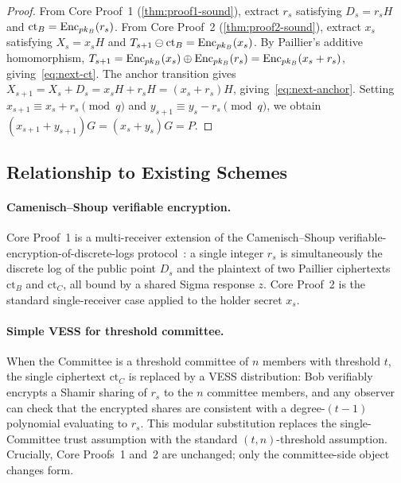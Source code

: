 \begin{proof}
From Core Proof~1 (\autoref{thm:proof1-sound}), extract $r_s$ satisfying $D_s = r_s H$ and $\mathrm{ct}_B = \mathrm{Enc}_{pk_B}(r_s)$. From Core Proof~2 (\autoref{thm:proof2-sound}), extract $x_s$ satisfying $X_s = x_s H$ and $T_{s+1} \ominus \mathrm{ct}_B = \mathrm{Enc}_{pk_B}(x_s)$. By Paillier's additive homomorphism, $T_{s+1} = \mathrm{Enc}_{pk_B}(x_s) \oplus \mathrm{Enc}_{pk_B}(r_s) = \mathrm{Enc}_{pk_B}(x_s + r_s)$, giving~\eqref{eq:next-ct}. The anchor transition gives $X_{s+1} = X_s + D_s = x_s H + r_s H = (x_s + r_s) H$, giving~\eqref{eq:next-anchor}. Setting $x_{s+1} \equiv x_s + r_s \pmod{q}$ and $y_{s+1} \equiv y_s - r_s \pmod{q}$, we obtain $(x_{s+1} + y_{s+1})G = (x_s + y_s)G = P$.
\end{proof}

\subsection{Relationship to Existing Schemes}\label{sec:relationship}

\paragraph{Camenisch--Shoup verifiable encryption.} Core Proof~1 is a multi-receiver extension of the Camenisch--Shoup verifiable-encryption-of-discrete-logs protocol~\cite{camenisch2003verifiable}: a single integer $r_s$ is simultaneously the discrete log of the public point $D_s$ and the plaintext of two Paillier ciphertexts $\mathrm{ct}_B$ and $\mathrm{ct}_C$, all bound by a shared Sigma response $z$. Core Proof~2 is the standard single-receiver case applied to the holder secret $x_s$.

\paragraph{Simple VESS for threshold committee.} When the Committee is a threshold committee of $n$ members with threshold $t$, the single ciphertext $\mathrm{ct}_C$ is replaced by a VESS distribution: Bob verifiably encrypts a Shamir sharing of $r_s$ to the $n$ committee members, and any observer can check that the encrypted shares are consistent with a degree-$(t{-}1)$ polynomial evaluating to $r_s$. This modular substitution replaces the single-Committee trust assumption with the standard $(t, n)$-threshold assumption. Crucially, Core Proofs~1 and~2 are unchanged; only the committee-side object changes form.

